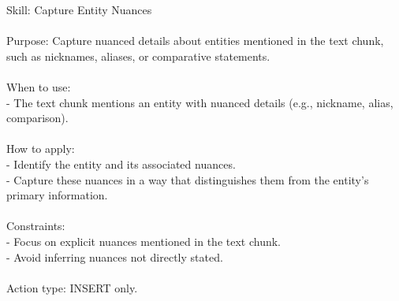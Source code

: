 \begin{center}
\begin{tcolorbox}[
  title={Evolved Skill on LoCoMo - CAPTURE\_ENTITY\_NUANCES},
  colback=blue!2!white,
  colframe=blue!35!black,
  colbacktitle=blue!15!white,
  coltitle=black,
  coltext=black
]
{
Skill: Capture Entity Nuances \\\\
Purpose: Capture nuanced details about entities mentioned in the text chunk, such as nicknames, aliases, or comparative statements. \\\\
When to use: \\
- The text chunk mentions an entity with nuanced details (e.g., nickname, alias, comparison). \\\\
How to apply: \\
- Identify the entity and its associated nuances. \\
- Capture these nuances in a way that distinguishes them from the entity's primary information. \\\\
Constraints: \\
- Focus on explicit nuances mentioned in the text chunk. \\
- Avoid inferring nuances not directly stated. \\\\
Action type: INSERT only.
}
\label{appendix:case_capture_entity_nuances}
\end{tcolorbox}
\end{center}

